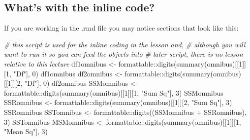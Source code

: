 \documentclass[
  11pt,
]{book}
\newenvironment{Shaded}{\begin{snugshade}}{\end{snugshade}}
\newcommand{\CommentTok}[1]{\textcolor[rgb]{0.56,0.35,0.01}{\textit{#1}}}
\newcommand{\DecValTok}[1]{\textcolor[rgb]{0.00,0.00,0.81}{#1}}
\newcommand{\FunctionTok}[1]{\textcolor[rgb]{0.00,0.00,0.00}{#1}}
\newcommand{\NormalTok}[1]{#1}
\newcommand{\OtherTok}[1]{\textcolor[rgb]{0.56,0.35,0.01}{#1}}
\newcommand{\SpecialCharTok}[1]{\textcolor[rgb]{0.00,0.00,0.00}{#1}}
\newcommand{\StringTok}[1]{\textcolor[rgb]{0.31,0.60,0.02}{#1}}
\begin{document}
\hypertarget{whats-with-the-inline-code}{%
\subsection{What's with the inline code?}\label{whats-with-the-inline-code}}

If you are working in the .rmd file you may notice sections that look like this:

\begin{Shaded}
\begin{Highlighting}[]
\CommentTok{\# this script is used for the inline coding in the lesson and,}
\CommentTok{\# although you will want to run it so you can \textquotesingle{}feed\textquotesingle{} the objects into}
\CommentTok{\# later script, there is no \textquotesingle{}lesson\textquotesingle{} relative to this lecture}
\NormalTok{df1omnibus }\OtherTok{\textless{}{-}}\NormalTok{ formattable}\SpecialCharTok{::}\FunctionTok{digits}\NormalTok{(}\FunctionTok{summary}\NormalTok{(omnibus)[[}\DecValTok{1}\NormalTok{]][}\DecValTok{1}\NormalTok{, }\StringTok{"Df"}\NormalTok{], }\DecValTok{0}\NormalTok{)}
\NormalTok{df1omnibus}
\NormalTok{df2omnibus }\OtherTok{\textless{}{-}}\NormalTok{ formattable}\SpecialCharTok{::}\FunctionTok{digits}\NormalTok{(}\FunctionTok{summary}\NormalTok{(omnibus)[[}\DecValTok{1}\NormalTok{]][}\DecValTok{2}\NormalTok{, }\StringTok{"Df"}\NormalTok{], }\DecValTok{0}\NormalTok{)}
\NormalTok{df2omnibus}
\NormalTok{SSMomnibus }\OtherTok{\textless{}{-}}\NormalTok{ formattable}\SpecialCharTok{::}\FunctionTok{digits}\NormalTok{(}\FunctionTok{summary}\NormalTok{(omnibus)[[}\DecValTok{1}\NormalTok{]][}\DecValTok{1}\NormalTok{, }\StringTok{"Sum Sq"}\NormalTok{], }\DecValTok{3}\NormalTok{)}
\NormalTok{SSMomnibus}
\NormalTok{SSRomnibus }\OtherTok{\textless{}{-}}\NormalTok{ formattable}\SpecialCharTok{::}\FunctionTok{digits}\NormalTok{(}\FunctionTok{summary}\NormalTok{(omnibus)[[}\DecValTok{1}\NormalTok{]][}\DecValTok{2}\NormalTok{, }\StringTok{"Sum Sq"}\NormalTok{], }\DecValTok{3}\NormalTok{)}
\NormalTok{SSRomnibus}
\NormalTok{SSTomnibus }\OtherTok{\textless{}{-}}\NormalTok{ formattable}\SpecialCharTok{::}\FunctionTok{digits}\NormalTok{((SSMomnibus }\SpecialCharTok{+}\NormalTok{ SSRomnibus), }\DecValTok{3}\NormalTok{)}
\NormalTok{SSTomnibus}
\NormalTok{MSMomnibus }\OtherTok{\textless{}{-}}\NormalTok{ formattable}\SpecialCharTok{::}\FunctionTok{digits}\NormalTok{(}\FunctionTok{summary}\NormalTok{(omnibus)[[}\DecValTok{1}\NormalTok{]][}\DecValTok{1}\NormalTok{, }\StringTok{"Mean Sq"}\NormalTok{],}
    \DecValTok{3}\NormalTok{)}

\end{Highlighting}
\end{Shaded}
\end{document}
